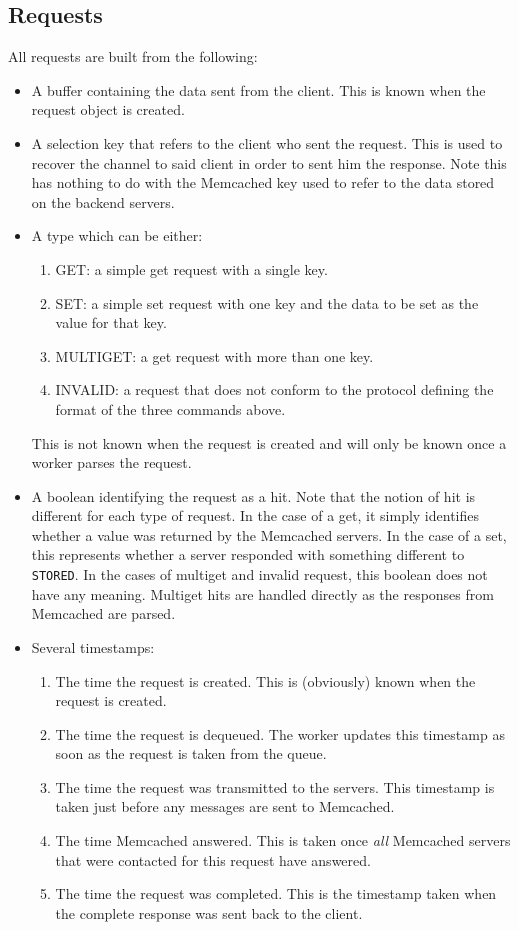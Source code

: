 \documentclass[11pt,a4paper]{article}
\begin{document}
\subsection{Requests}
All requests are built from the following:
\begin{itemize}
    \item A buffer containing the data sent from the client. This is known when the request object is created.
    \item A selection key that refers to the client who sent the request. This is used to recover the channel to said client in order to sent him the response. Note this has nothing to do with the Memcached key used to refer to the data stored on the backend servers.
    \item A type which can be either:
    \begin{enumerate}
        \item GET: a simple get request with a single key.
        \item SET: a simple set request with one key and the data to be set as the value for that key.
        \item MULTIGET: a get request with more than one key.
        \item INVALID: a request that does not conform to the protocol defining the format of the three commands above.
    \end{enumerate}
    This is not known when the request is created and will only be known once a worker parses the request.
    \item A boolean identifying the request as a hit. Note that the notion of hit is different for each type of request. In the case of a get, it simply identifies whether a value was returned by the Memcached servers. In the case of a set, this represents whether a server responded with something different to \texttt{STORED}. In the cases of multiget and invalid request, this boolean does not have any meaning. Multiget hits are handled directly as the responses from Memcached are parsed.
    \item Several timestamps:
    \begin{enumerate}
        \item The time the request is created. This is (obviously) known when the request is created.
        \item The time the request is dequeued. The worker updates this timestamp as soon as the request is taken from the queue.
        \item The time the request was transmitted to the servers. This timestamp is taken just before any messages are sent to Memcached.
        \item The time Memcached answered. This is taken once \textit{all} Memcached servers that were contacted for this request have answered.
        \item The time the request was completed. This is the timestamp taken when the complete response was sent back to the client.
    \end{enumerate}
\end{itemize}
\end{document}
